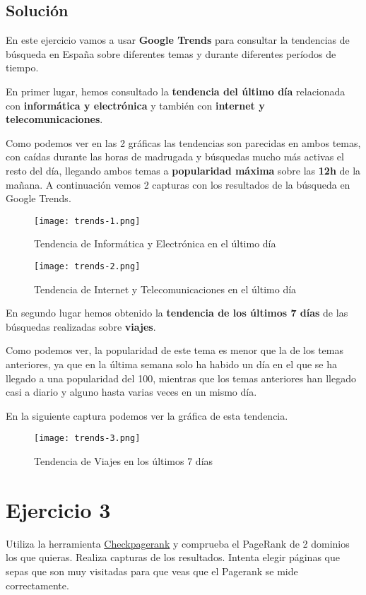 \subsection{Solución}
En este ejercicio vamos a usar \textbf{Google Trends} para consultar la tendencias de búsqueda en España sobre diferentes temas y durante diferentes períodos de tiempo.

En primer lugar, hemos consultado la \textbf{tendencia del último día} relacionada con \textbf{informática y electrónica} y también con \textbf{internet y telecomunicaciones}.

Como podemos ver en las 2 gráficas las tendencias son parecidas en ambos temas, con caídas durante las horas de madrugada y búsquedas mucho más activas el resto del día, llegando ambos temas a \textbf{popularidad máxima} sobre las \textbf{12h} de la mañana. A continuación vemos 2 capturas con los resultados de la búsqueda en Google Trends.

\begin{figure}[H]
    \centering
    \texttt{[image: trends-1.png]}
    \caption{Tendencia de Informática y Electrónica en el último día}
\end{figure}

\begin{figure}[H]
    \centering
    \texttt{[image: trends-2.png]}
    \caption{Tendencia de Internet y Telecomunicaciones en el último día}
\end{figure}

En segundo lugar hemos obtenido la \textbf{tendencia de los últimos 7 días} de las búsquedas realizadas sobre \textbf{viajes}.

Como podemos ver, la popularidad de este tema es menor que la de los temas anteriores, ya que en la última semana solo ha habido un día en el que se ha llegado a una popularidad del 100, mientras que los temas anteriores han llegado casi a diario y alguno hasta varias veces en un mismo día.

En la siguiente captura podemos ver la gráfica de esta tendencia.

\begin{figure}[H]
    \centering
    \texttt{[image: trends-3.png]}
    \caption{Tendencia de Viajes en los últimos 7 días}
\end{figure}

\section{Ejercicio 3}
Utiliza la herramienta \href{https://checkpagerank.net/}{Checkpagerank}  y comprueba el PageRank de 2 dominios los que quieras. Realiza capturas de los resultados. Intenta elegir páginas que sepas que son muy visitadas para que veas que el Pagerank se mide correctamente.

